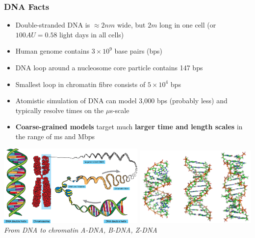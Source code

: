 \documentclass[slidestop,compress,9pt]{beamer}
\begin{document}
\begin{frame}
\frametitle{DNA Facts}

\begin{itemize}
\item Double-stranded DNA is $\approx 2 nm$ wide, but $2m$ long in one cell (or $100 AU = 0.58$ light days in all cells)
\item Human genome contains $3\times10^{9}$ base pairs (bps)
\item DNA loop around a nucleosome core particle contains 147 bps
\item Smallest loop in chromatin fibre consists of $5\times10^4$ bps
\item Atomistic simulation of DNA can model 3,000 bps (probably less) and typically resolve times on the $\mu$s-scale  
\item \textbf{Coarse-grained models} target much \textbf{larger time and length scales} in the range of ms and Mbps 
\end{itemize}

\vspace*{-0.25cm}
\begin{center}
\includegraphics[width=0.54\textwidth]{fromDNAtoChromatin.png}
\includegraphics[width=0.45\textwidth]{A-B-Z-DNA.png}\\
\textit{From DNA to chromatin} \hspace{2.75cm} \textit{A-DNA, B-DNA, Z-DNA}
\end{center}

\end{frame}
\end{document}
